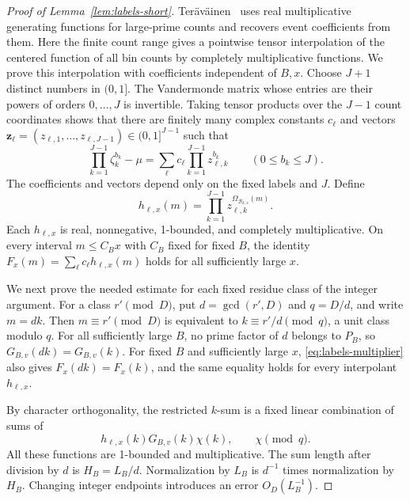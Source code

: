 \begin{proof}[Proof of Lemma~\ref{lem:labels-short}]
Ter\"av\"ainen~\cite[Section~4, proof of Theorem~1.11]{Teravainen2018}
uses real multiplicative generating functions for large-prime counts and
recovers event coefficients from them.  Here the finite count range gives
a pointwise tensor interpolation of the centered function of all bin
counts by completely multiplicative functions.  We prove this
interpolation with coefficients independent of $B,x$.
Choose $J+1$ distinct numbers in $(0,1]$.  The Vandermonde matrix whose
entries are their powers of orders $0,\ldots,J$ is invertible.
Taking tensor products over the $J-1$ count coordinates shows that
there are finitely many complex constants $c_\ell$ and vectors
$\boldsymbol z_\ell=(z_{\ell,1},\ldots,z_{\ell,J-1})\in(0,1]^{J-1}$
such that
\begin{equation}\label{eq:labels-interpolation}
 \prod_{k=1}^{J-1}\zeta_k^{b_k}-\mu
 =\sum_\ell c_\ell\prod_{k=1}^{J-1}z_{\ell,k}^{b_k}
 \qquad(0\leq b_k\leq J).
\end{equation}
The coefficients and vectors depend only on the fixed labels and $J$.
Define
\[
 h_{\ell,x}(m)=\prod_{k=1}^{J-1}
                   z_{\ell,k}^{\Omega_{\mathcal B_{k,x}}(m)}.
\]
Each $h_{\ell,x}$ is real, nonnegative, 1-bounded, and completely
multiplicative.  On every interval $m\leq C_Bx$ with $C_B$ fixed
for fixed $B$, the identity
$F_x(m)=\sum_\ell c_\ell h_{\ell,x}(m)$ holds for all sufficiently
large $x$.

We next prove the needed estimate for each fixed residue class of the
integer argument.  For a class $r'\pmod D$, put
$d=\gcd(r',D)$ and $q=D/d$, and write $m=dk$.  Then $m\equiv r'\pmod D$
is equivalent to $k\equiv r'/d\pmod q$, a unit class modulo $q$.
For all sufficiently large $B$, no prime factor of $d$ belongs to
$P_B$, so $G_{B,v}(dk)=G_{B,v}(k)$.  For fixed $B$ and sufficiently
large $x$, \eqref{eq:labels-multiplier} also gives
$F_x(dk)=F_x(k)$, and the same equality holds for every interpolant
$h_{\ell,x}$.

By character orthogonality, the restricted $k$-sum is a fixed linear
combination of sums of
\begin{equation}\label{eq:labels-twisted-interpolants}
 h_{\ell,x}(k)G_{B,v}(k)\chi(k),\qquad \chi\pmod q.
\end{equation}
All these functions are 1-bounded and multiplicative.  The sum
length after division by $d$ is $H_B=L_B/d$.  Normalization by
$L_B$ is $d^{-1}$ times normalization by $H_B$.
Changing integer endpoints introduces an error $O_D(L_B^{-1})$.


\end{proof}

